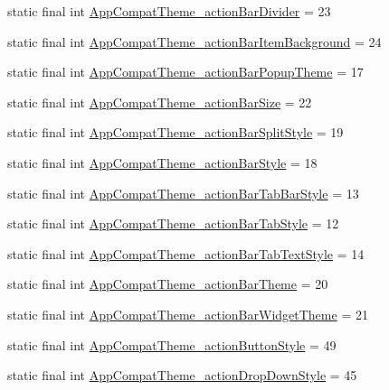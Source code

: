 \begin{DoxyCompactItemize}
\item 
static final int \hyperlink{classproject4_1_1xaria_1_1R_1_1styleable_ad095f54263895a9187adcc505fb74a8f}{App\+Compat\+Theme\+\_\+action\+Bar\+Divider} = 23
\item 
static final int \hyperlink{classproject4_1_1xaria_1_1R_1_1styleable_a41713bbf73db9bc84e075b5f7f3d9eac}{App\+Compat\+Theme\+\_\+action\+Bar\+Item\+Background} = 24
\item 
static final int \hyperlink{classproject4_1_1xaria_1_1R_1_1styleable_a4ab9cdea85449aae1d84d21ff4fb2cfa}{App\+Compat\+Theme\+\_\+action\+Bar\+Popup\+Theme} = 17
\item 
static final int \hyperlink{classproject4_1_1xaria_1_1R_1_1styleable_ab4089eb2d0e03e7fe09ecada776ec627}{App\+Compat\+Theme\+\_\+action\+Bar\+Size} = 22
\item 
static final int \hyperlink{classproject4_1_1xaria_1_1R_1_1styleable_ac50c18be5c3e3ba9e240f8f463553bb8}{App\+Compat\+Theme\+\_\+action\+Bar\+Split\+Style} = 19
\item 
static final int \hyperlink{classproject4_1_1xaria_1_1R_1_1styleable_abe5ffee6e83546a5c7599f052a12bdba}{App\+Compat\+Theme\+\_\+action\+Bar\+Style} = 18
\item 
static final int \hyperlink{classproject4_1_1xaria_1_1R_1_1styleable_a8061a97d3435cd3b90071e77b6a384d0}{App\+Compat\+Theme\+\_\+action\+Bar\+Tab\+Bar\+Style} = 13
\item 
static final int \hyperlink{classproject4_1_1xaria_1_1R_1_1styleable_ac191cc6e34d8b07e8c5375d0e9060ad5}{App\+Compat\+Theme\+\_\+action\+Bar\+Tab\+Style} = 12
\item 
static final int \hyperlink{classproject4_1_1xaria_1_1R_1_1styleable_ac76a4f213c72e9795418b8e7289f0feb}{App\+Compat\+Theme\+\_\+action\+Bar\+Tab\+Text\+Style} = 14
\item 
static final int \hyperlink{classproject4_1_1xaria_1_1R_1_1styleable_a872840b3faa033949bb39c7e8ccf3802}{App\+Compat\+Theme\+\_\+action\+Bar\+Theme} = 20
\item 
static final int \hyperlink{classproject4_1_1xaria_1_1R_1_1styleable_acd160671a7a2ffa11d0fcabb3488ff5f}{App\+Compat\+Theme\+\_\+action\+Bar\+Widget\+Theme} = 21
\item 
static final int \hyperlink{classproject4_1_1xaria_1_1R_1_1styleable_ac0a46ce92a97f618843444fe78e175e5}{App\+Compat\+Theme\+\_\+action\+Button\+Style} = 49
\item 
static final int \hyperlink{classproject4_1_1xaria_1_1R_1_1styleable_a3ed86c6082101f35233a25e96d5bd2f3}{App\+Compat\+Theme\+\_\+action\+Drop\+Down\+Style} = 45

\end{DoxyCompactItemize}
